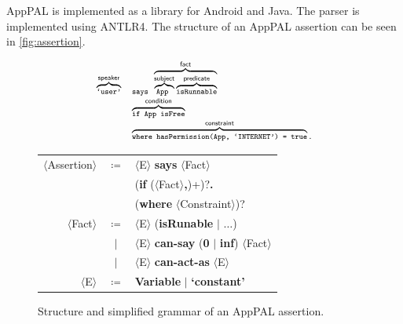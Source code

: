 \documentclass[]{llncs}
\begin{document}
AppPAL is implemented as a library for Android and Java.
The parser is implemented using ANTLR4.
The structure of an AppPAL assertion can be seen in \autoref{fig:assertion}.

\begin{figure}
  \newcommand{\bracetext}[1]{\text{\sffamily #1}}
  \newcommand{\smalltext}[1]{\text{\ttfamily\scriptsize #1}}
  \centering
  \begin{minipage}{0.49\linewidth}
    \begin{equation*}\small
      \begin{array}{r l}\footnotesize
        \overbrace{\smalltext{`user'}}^{\bracetext{speaker}} &
        \smalltext{ says }\overbrace{\overbrace{\smalltext{ App }}^{\bracetext{subject}}\overbrace{\smalltext{ isRunnable}}^{\bracetext{predicate}}}^{\bracetext{fact}} \\
        & \overbrace{\smalltext{ if App isFree}}^{\bracetext{condition}} \\
        & \overbrace{\smalltext{ where hasPermission(App, `INTERNET') = true}}^{\bracetext{constraint}}.
      \end{array}
    \end{equation*}
  \end{minipage}
  \begin{minipage}{0.49\linewidth}
  \newcommand{\nonterminal}[1]{$\langle$#1$\rangle$}
  \newcommand{\terminal}[1]{\textbf{#1}}
  \begin{tabular}{r c l}
    \footnotesize
    \nonterminal{Assertion} & $\coloneqq$ & \nonterminal{E} \terminal{says} \nonterminal{Fact} \\
                            &             & \hspace{1em}(\terminal{if} (\nonterminal{Fact}\terminal{,})+)?\terminal{.} \\
                            &             & \hspace{1em}(\terminal{where} \nonterminal{Constraint})? \\
    \nonterminal{Fact}      & $\coloneqq$ & \nonterminal{E} (\terminal{isRunable} $\vert$ $\ldots$) \\
                            & $\vert$     & \nonterminal{E} \terminal{can-say} (\terminal{0} $\vert$ \terminal{inf}) \nonterminal{Fact} \\
                            & $\vert$     & \nonterminal{E} \terminal{can-act-as} \nonterminal{E} \\
    \nonterminal{E}         & $\coloneqq$ & \terminal{Variable} $\vert$ \terminal{`constant'}
  \end{tabular}
  \end{minipage}
  \caption{Structure and simplified grammar of an AppPAL assertion.}
  \label{fig:assertion}
\end{figure}
\end{document}
